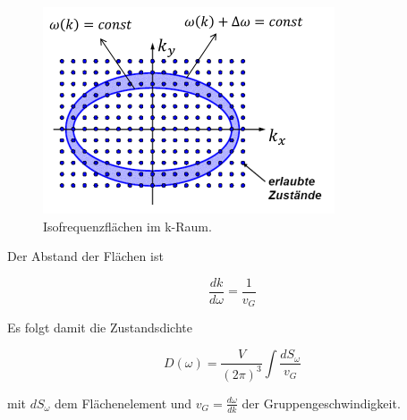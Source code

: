\begin{figure}[H]
    \centering
    \includegraphics[width=.75\textwidth]{resources/31-10-2013/dw.png}
    \caption{Isofrequenzflächen im k-Raum.}
    \label{fig:q88:dw}
\end{figure}

Der Abstand der Flächen ist

\begin{equation}
    \frac{d k}{d \omega} = \frac{1}{v_G}
\end{equation}

Es folgt damit die Zustandsdichte

\begin{equation}
    D(\omega) = \frac{V}{(2\pi)^3} \int \frac{d S_{\omega}}{v_G}
\end{equation}

mit $d S_{\omega}$ dem Flächenelement und $v_G = \frac{d \omega}{d k}$ der Gruppengeschwindigkeit.